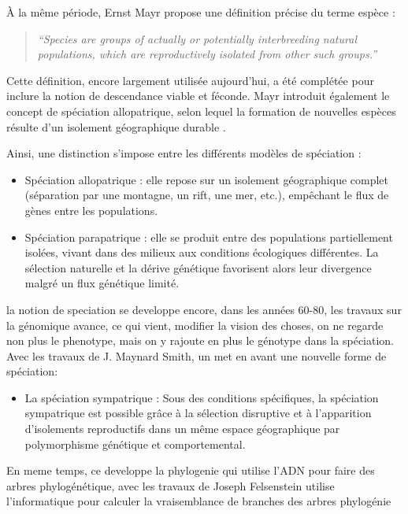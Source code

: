 \documentclass[12pt,a4paper]{article}
\begin{document}
À la même période, Ernst Mayr propose une définition précise du terme espèce :

\begin{quote}
    \textit{“Species are groups of actually or potentially interbreeding natural populations, which are reproductively isolated from other such groups.”}
\end{quote}

Cette définition, encore largement utilisée aujourd’hui, a été complétée pour inclure la notion de descendance viable et féconde.
Mayr introduit également le concept de spéciation allopatrique, selon lequel la formation de nouvelles espèces résulte d’un isolement géographique durable \parencite{mayr1942systematics}.

Ainsi, une distinction s’impose entre les différents modèles de spéciation :

\begin{itemize}
    \item Spéciation allopatrique : elle repose sur un isolement géographique complet (séparation par une montagne, un rift, une mer, etc.), empêchant le flux de gènes entre les populations.
    \item Spéciation parapatrique : elle se produit entre des populations partiellement isolées, vivant dans des milieux aux conditions écologiques différentes. La sélection naturelle et la dérive génétique favorisent alors leur divergence malgré un flux génétique limité.
\end{itemize}

la notion de speciation se developpe encore, dans les années 60-80, les travaux sur la génomique avance, ce qui vient, modifier la vision des choses, on ne regarde non plus le phenotype, mais on y rajoute en plus le génotype dans la spéciation. Avec les travaux de J. Maynard Smith, un met en avant une nouvelle forme de spéciation:
\begin{itemize}
    \item La spéciation sympatrique : Sous des conditions spécifiques, la
          spéciation sympatrique est possible grâce à la sélection disruptive et à
          l'apparition d'isolements reproductifs dans un même espace géographique par
          polymorphisme génétique et comportemental.\parencite{maynardsmith1966sympatric}
\end{itemize}

En meme temps, ce developpe la phylogenie qui utilise l'ADN pour faire des arbres phylogénétique, avec les travaux de Joseph Felsenstein  utilise l'informatique pour calculer la vraisemblance de branches des arbres phylogénie \parencite{felsenstein1981evolutionary}%
\end{document}

